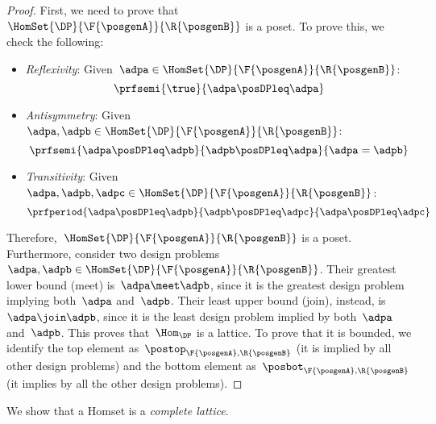 \begin{proof}
    First, we need to prove that~$\HomSet{\DP}{\F{\posgenA}}{\R{\posgenB}}$ is a poset.
    To prove this, we check the following:
    \begin{itemize}
        \item \emph{Reflexivity}: Given~$\adpa\in \HomSet{\DP}{\F{\posgenA}}{\R{\posgenB}}$:
              \begin{equation*}
                  \prfsemi{
                      \true
                  }{
                      \adpa\posDPleq \adpa
                  }
              \end{equation*}
        \item \emph{Antisymmetry}: Given~$\adpa,\adpb\in \HomSet{\DP}{\F{\posgenA}}{\R{\posgenB}}$:
              \begin{equation*}
                  \prfsemi{
                      \adpa\posDPleq \adpb
                  }{
                      \adpb\posDPleq \adpa
                  }{
                      \adpa=\adpb
                  }
              \end{equation*}
        \item \emph{Transitivity}: Given~$\adpa,\adpb,\adpc\in \HomSet{\DP}{\F{\posgenA}}{\R{\posgenB}}$:
              \begin{equation*}
                  \prfperiod{
                      \adpa\posDPleq \adpb
                  }{
                      \adpb\posDPleq \adpc
                  }{
                      \adpa \posDPleq \adpc
                  }
              \end{equation*}
    \end{itemize}
    Therefore,~$\HomSet{\DP}{\F{\posgenA}}{\R{\posgenB}}$ is a poset.
    Furthermore, consider two design problems~$\adpa,\adpb\in \HomSet{\DP}{\F{\posgenA}}{\R{\posgenB}}$.
    Their greatest lower bound (meet) is~$\adpa\meet\adpb$, since it is the greatest design problem implying both~$\adpa$ and~$\adpb$.
    Their least upper bound (join), instead, is~$\adpa\join \adpb$, since it is the least design problem implied by both~$\adpa$ and~$\adpb$.
    This proves that~$\Hom_\DP$ is a lattice.
    To prove that it is bounded, we identify the top element as~$\postop_{\F{\posgenA},\R{\posgenB}}$ (it is implied by all other design problems) and the bottom element as~$\posbot_{\F{\posgenA},\R{\posgenB}}$ (it implies by all the other design problems).
\end{proof}

We show that a \DP Homset is a \emph{complete lattice}.

